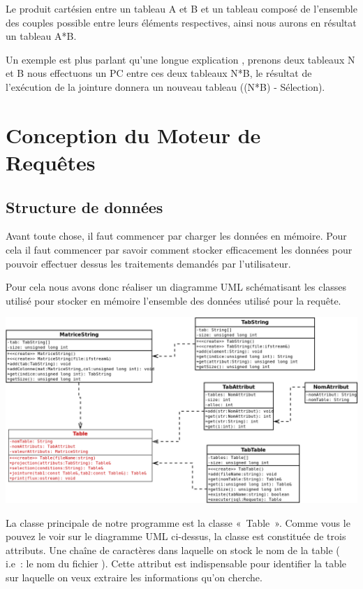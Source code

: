 \documentclass[oneside,13pt,a4paper]{report}
\begin{document}
            Le produit cartésien entre un tableau A et B et un tableau composé de l'ensemble des couples possible entre leurs éléments respectives, ainsi nous aurons en résultat un tableau A*B.

	          Un exemple est plus parlant qu'une longue explication , prenons deux tableaux N et B nous effectuons un PC entre ces deux tableaux N*B, le résultat de l’exécution de la jointure donnera un nouveau tableau ((N*B) - Sélection).


    \chapter{Conception du Moteur de Requêtes}

        \section{Structure de données}
            Avant toute chose, il faut commencer par charger les données en mémoire. Pour cela il faut commencer par savoir comment stocker efficacement les données pour pouvoir effectuer dessus les traitements demandés par l’utilisateur.

            Pour cela nous avons donc réaliser un diagramme UML schématisant les classes utilisé pour stocker en mémoire l’ensemble des données utilisé pour la requête.

            \includegraphics[width=1\textwidth]{img/sql.png}\par

            La classe principale de notre programme est la classe « Table ». Comme vous le pouvez le voir sur le diagramme UML ci-dessus, la classe est constituée de trois attributs. Une chaîne de caractères dans laquelle on stock le nom de la table ( i.e : le nom du fichier ). Cette attribut est indispensable pour identifier la table sur laquelle on veux extraire les informations qu’on cherche.
\end{document}
